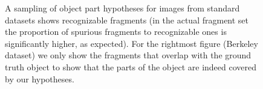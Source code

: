 \begin{figure}[!t]
  \caption{\FigureFont A sampling of  object part hypotheses for images
from standard datasets shows recognizable fragments (in the actual fragment
set
the proportion of  
spurious fragments to recognizable ones is significantly higher, as expected).  For the rightmost figure (Berkeley dataset) we
only show the fragments that overlap with the ground truth object to show
that the parts of the object are indeed covered by our hypotheses. 
 }
\label{fig:fragments:examples}
\end{figure}

